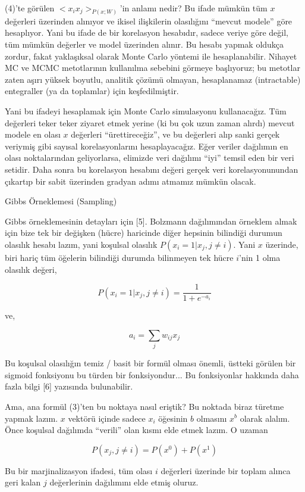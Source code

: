 \documentclass[12pt,fleqn]{article}\usepackage{../../common}
\begin{document}
(4)'te görülen $< x_ix_j >_{P(x;W)}$'in anlamı nedir? Bu ifade mümkün tüm $x$
değerleri üzerinden alınıyor ve ikisel ilişkilerin olasılığını ``mevcut
modele'' göre hesaplıyor. Yani bu ifade de bir korelasyon hesabıdır, sadece
veriye göre değil, tüm mümkün değerler ve model üzerinden alınır. Bu hesabı
yapmak oldukça zordur, fakat yaklaşıksal olarak Monte Carlo yöntemi ile
hesaplanabilir. Nihayet MC ve MCMC metotlarının kullanılma sebebini görmeye
başlıyoruz; bu metotlar zaten aşırı yüksek boyutlu, analitik çözümü
olmayan, hesaplanamaz (intractable) entegraller (ya da toplamlar) için
keşfedilmiştir. 

Yani bu ifadeyi hesaplamak için Monte Carlo simulasyonu kullanacağız. Tüm
değerleri teker teker ziyaret etmek yerine (ki bu çok uzun zaman alırdı)
mevcut modele en olası $x$ değerleri ``ürettireceğiz'', ve bu değerleri
alıp sanki gerçek veriymiş gibi sayısal korelasyonlarını
hesaplayacağız. Eğer veriler dağılımın en olası noktalarından geliyorlarsa,
elimizde veri dağılımı ``iyi'' temsil eden bir veri setidir. Daha sonra bu
korelasyon hesabını değeri gerçek veri korelasyonunundan çıkartıp bir sabit
üzerinden gradyan adımı atmamız mümkün olacak.

Gibbs Örneklemesi (Sampling)

Gibbs örneklemesinin detayları için [5]. Bolzmann dağılımından örneklem
almak için bize tek bir değişken (hücre) haricinde diğer hepsinin bilindiği
durumun olasılık hesabı lazım, yani koşulsal olasılık
$P(x_i = 1 | x_j, j \ne i)$. Yani $x$ üzerinde, biri hariç tüm öğelerin
bilindiği durumda bilinmeyen tek hücre $i$'nin 1 olma olasılık değeri,

$$ 
P(x_i = 1 | x_j, j \ne i) = \frac{1}{1 + e^{-a_i}} 
$$

ve,

$$ 
a_i = \sum_j  w_{ij}x_j 
$$

Bu koşulsal olasılığın temiz / basit bir formül olması önemli, üstteki
görülen bir sigmoid fonksiyonu bu türden bir fonksiyondur... Bu
fonksiyonlar hakkında daha fazla bilgi [6] yazısında bulunabilir.

Ama, ana formül (3)'ten bu noktaya nasıl eriştik? Bu noktada biraz türetme
yapmak lazım. $x$ vektörü içinde sadece $x_i$ öğesinin $b$ olmasını $x^b$ olarak
alalım. Önce koşulsal dağılımda ``verili'' olan kısmı elde etmek lazım. O
uzaman

$$ 
P(x_j,j \ne i) = P(x^0) + P(x^1) 
$$

Bu bir marjinalizasyon ifadesi, tüm olası $i$ değerleri üzerinde bir toplam
alınca geri kalan $j$ değerlerinin dağılımını elde etmiş oluruz. 
\end{document}
